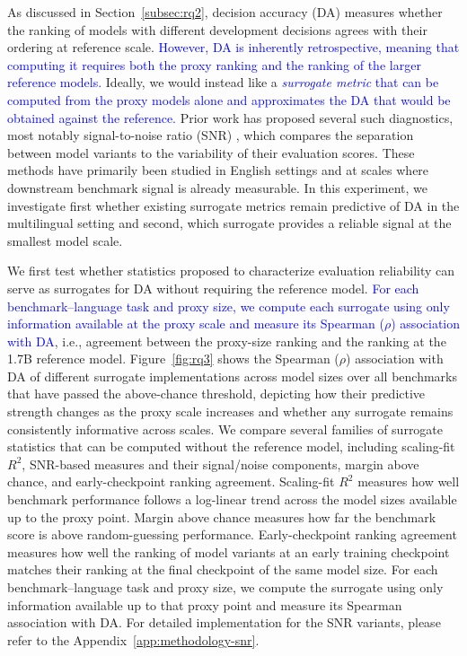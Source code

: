 As discussed in Section~\ref{subsec:rq2}, decision accuracy (DA) measures whether the ranking of models with different development decisions agrees with their ordering at reference scale.
\textcolor{blue}{However, DA is inherently retrospective, meaning that computing it requires both the proxy ranking and the ranking of the larger reference models.}
Ideally, we would instead like a \textcolor{blue}{\textit{surrogate metric} that can be computed from the proxy models alone and approximates the DA that would be obtained against the reference.}
Prior work has proposed several such diagnostics, most notably signal-to-noise ratio (SNR) \citep{heineman_signal_2025}, which compares the separation between model variants to the variability of their evaluation scores.
These methods have primarily been studied in English settings and at scales where downstream benchmark signal is already measurable.
In this experiment, we investigate first whether existing surrogate metrics remain predictive of DA in the multilingual setting and second, which surrogate provides a reliable signal at the smallest model scale.

We first test whether statistics proposed to characterize evaluation reliability can serve as surrogates for DA without requiring the reference model.
\textcolor{blue}{For each benchmark--language task and proxy size, we compute each surrogate using only information available at the proxy scale and measure its Spearman ($\rho$) association with DA}, i.e., agreement between the proxy-size ranking and the ranking at the 1.7B reference model.
Figure~\ref{fig:rq3} shows the Spearman ($\rho$) association with DA of different surrogate implementations across model sizes over all benchmarks that have passed the above-chance threshold, depicting how their predictive strength changes as the proxy scale increases and whether any surrogate remains consistently informative across scales.
We compare several families of surrogate statistics that can be computed without the reference model, including scaling-fit \(R^2\), SNR-based measures \citep{heineman_signal_2025} and their signal/noise components, margin above chance, and early-checkpoint ranking agreement.
Scaling-fit \(R^2\) measures how well benchmark performance follows a log-linear trend across the model sizes available up to the proxy point. Margin above chance measures how far the benchmark score is above random-guessing performance. Early-checkpoint ranking agreement measures how well the ranking of model variants at an early training checkpoint matches their ranking at the final checkpoint of the same model size.
For each benchmark--language task and proxy size, we compute the surrogate using only information available up to that proxy point and measure its Spearman association with DA.
For detailed implementation for the SNR variants, please refer to the Appendix~\ref{app:methodology-snr}. 

